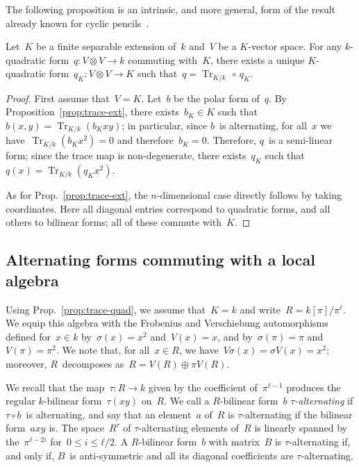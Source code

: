 \documentclass{lms}
\DeclareMathOperator\Tr{Tr}
\begin{document}
The following proposition is an intrinsic, and more general, form
of the result already known for cyclic pencils~\cite[Prop.~5]{MPG2013}.

\begin{prop} \label{prop:trace-quad}
Let~$K$ be a finite separable extension of~$k$ and~$V$ be a $K$-vector
space. For any $k$-quadratic form~$q: V ⊗ V → k$ commuting with~$K$,
there exists a unique $K$-quadratic form~$q_K: V ⊗ V → K$ such that~$q =
\Tr_{K/k} \, ∘ \, q_K$.
\end{prop}

\begin{proof}
First assume that~$V = K$.
Let~$b$ be the polar form of~$q$. By Proposition~\ref{prop:trace-ext},
there exists~$b_K ∈ K$
such that~$b(x,y) = \Tr_{K/k} (b_K xy)$; in particular, since $b$~is
alternating, for all~$x$ we have~$\Tr_{K/k} (b_K x^2) = 0$ and
therefore~$b_K = 0$. Therefore, $q$~is a semi-linear form; since the
trace map is non-degenerate, there exists~$q_K$ such that~$q(x) =
\Tr_{K/k} (q_K x^2)$.

As for Prop.~\ref{prop:trace-ext}, the $n$-dimensional case directly follows by
taking coordinates. Here all diagonal entries correspond to quadratic
forms, and all others to bilinear forms; all of these commute with~$K$.
\end{proof}

\subsection{Alternating forms commuting with a local algebra}
\label{SS:alt-pencil}

Using Prop.~\ref{prop:trace-quad},
we assume that~$K = k$ and write~$R = k[π] / π^ℓ$.
We equip this algebra with the Frobenius and Verschiebung automorphisms
defined for~$x ∈ k$ by~$σ(x) = x^2$ and~$V(x) = x$,
and by~$σ(π) = π$ and~$V(π) = π^2$.
We note that, for all~$x ∈ R$, we have~$V σ(x) = σ V(x) = x^2$;
moreover, $R$~decomposes as~$R = V(R) ⊕ π V(R)$.

We recall that the map~$τ: R → k$ given by the coefficient of~$π^{ℓ-1}$
produces the regular $k$-bilinear form~$τ(x y)$ on~$R$.
We call a $R$-bilinear form~$b$ \emph{$τ$-alternating} if $τ ∘ b$~is
alternating, and say that an element~$a$ of~$R$ is $τ$-alternating if the
bilinear form~$a x y$ is.
The space~$R^{τ}$ of $τ$-alternating elements of~$R$ is linearly spanned
by the~$π^{ℓ-2i}$ for~$0 ≤ i ≤ ℓ/2$.
A $R$-bilinear form~$b$ with matrix~$B$ is $τ$-alternating if, and only if,
$B$~is anti-symmetric and all its diagonal coefficients are $τ$-alternating.
\end{document}
